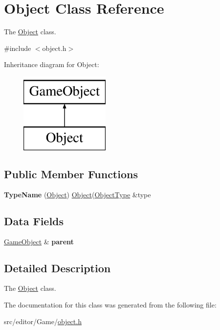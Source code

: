 \hypertarget{class_object}{\section{\-Object \-Class \-Reference}
\label{class_object}
}


\-The \hyperlink{class_object}{\-Object} class.  




{\ttfamily \#include $<$object.\-h$>$}

\-Inheritance diagram for \-Object\-:\begin{figure}[H]
\begin{center}
\leavevmode
\includegraphics[height=4.000000cm]{class_object}
\end{center}
\end{figure}
\subsection*{\-Public \-Member \-Functions}
\begin{DoxyCompactItemize}
\item 
\hypertarget{class_object_a16ba54acfb9c9cb7c4b10e5fddbb2677}{{\bfseries \-Type\-Name} (\hyperlink{class_object}{\-Object}) \hyperlink{class_object}{\-Object}(\hyperlink{class_object_type}{\-Object\-Type} \&type}\label{class_object_a16ba54acfb9c9cb7c4b10e5fddbb2677}

\end{DoxyCompactItemize}
\subsection*{\-Data \-Fields}
\begin{DoxyCompactItemize}
\item 
\hypertarget{class_object_a19a0ee4f314c724d39bd8d50b2cf93e2}{\hyperlink{class_game_object}{\-Game\-Object} \& {\bfseries parent}}\label{class_object_a19a0ee4f314c724d39bd8d50b2cf93e2}

\end{DoxyCompactItemize}


\subsection{\-Detailed \-Description}
\-The \hyperlink{class_object}{\-Object} class. 

\-The documentation for this class was generated from the following file\-:\begin{DoxyCompactItemize}
\item 
src/editor/\-Game/\hyperlink{object_8h}{object.\-h}\end{DoxyCompactItemize}
